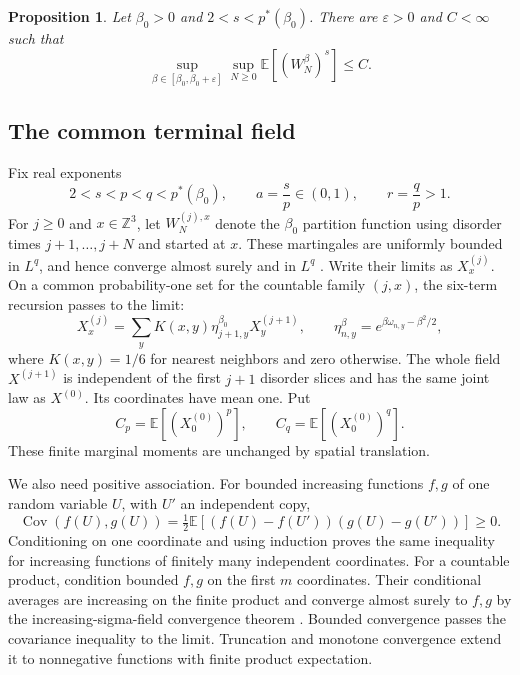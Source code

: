 \documentclass[11pt]{amsart}
\newcommand{\E}{\mathbb E}
\newcommand{\Z}{\mathbb Z}
\newcommand{\ps}{p^*}
\newtheorem{proposition}[theorem]{Proposition}
\theoremstyle{remark}
\numberwithin{equation}{section}
\begin{document}
\begin{proposition}\label{prop:stability}
Let $\beta_0>0$ and $2<s<\ps(\beta_0)$. There are $\varepsilon>0$ and
$C<\infty$ such that
\begin{equation}\label{eq:stability}
 \sup_{\beta\in[\beta_0,\beta_0+\varepsilon]}
 \sup_{N\ge0}\E[(W_N^\beta)^s]\le C.
\end{equation}
\end{proposition}

\subsection{The common terminal field}
Fix real exponents
\begin{equation}\label{eq:exponents}
 2<s<p<q<\ps(\beta_0),\qquad a=\frac{s}{p}\in(0,1),\qquad r=\frac qp>1.
\end{equation}
For $j\ge0$ and $x\in\Z^3$, let $W_N^{(j),x}$ denote the
$\beta_0$ partition function using disorder times $j+1,\ldots,j+N$ and
started at $x$. These martingales are uniformly bounded in $L^q$, and hence
converge almost surely and in $L^q$ \cite[Theorem~4.4.6]{Durrett}.
Write their limits as $X_x^{(j)}$. On a common probability-one set for the
countable family $(j,x)$, the six-term recursion passes to the limit:
\begin{equation}\label{eq:terminal-recursion}
 X_x^{(j)}=\sum_y K(x,y)\eta_{j+1,y}^{\beta_0}X_y^{(j+1)},
 \qquad \eta_{n,y}^{\beta}=e^{\beta\omega_{n,y}-\beta^2/2},
\end{equation}
where $K(x,y)=1/6$ for nearest neighbors and zero otherwise.
The whole field $X^{(j+1)}$ is independent of the first $j+1$ disorder
slices and has the same joint law as $X^{(0)}$. Its coordinates have mean one.
Put
\[
 C_p=\E[(X_0^{(0)})^p],\qquad C_q=\E[(X_0^{(0)})^q].
\]
These finite marginal moments are unchanged by spatial translation.

We also need positive association. For bounded increasing functions $f,g$
of one random variable $U$, with $U'$ an independent copy,
\[
 \operatorname{Cov}(f(U),g(U))
 =\tfrac12\E[(f(U)-f(U'))(g(U)-g(U'))]\ge0.
\]
Conditioning on one coordinate and using induction proves the same inequality
for increasing functions of finitely many independent coordinates. For a
countable product, condition bounded $f,g$ on the first $m$ coordinates.
Their conditional averages are increasing on the finite product and converge
almost surely to $f,g$ by the increasing-sigma-field convergence theorem
\cite[Theorem~4.6.8]{Durrett}. Bounded convergence passes the covariance
inequality to the limit. Truncation and monotone convergence extend it to
nonnegative functions with finite product expectation.
\end{document}
